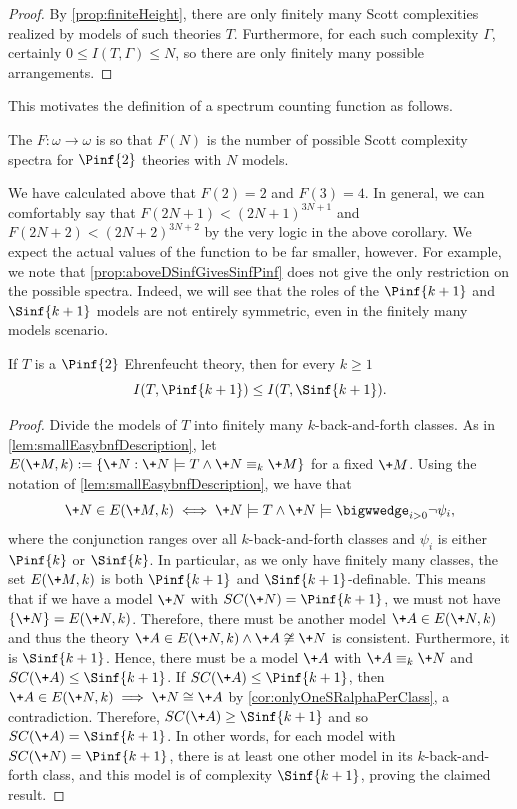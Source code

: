 \documentclass{amsart}
\renewcommand{\-}{\text{-}}
\begin{document}
\begin{proof}
By \cref{prop:finiteHeight}, there are only finitely many Scott complexities realized by models of such theories $T$.
Furthermore, for each such complexity $\Gamma$, certainly $0\leq I(T,\Gamma)\leq N$, so there are only finitely many possible arrangements.
\end{proof}

This motivates the definition of a spectrum counting function as follows.

\begin{definition}
  The  $F:\omega\to\omega$ is so that $F(N)$ is the number of possible Scott complexity spectra for $\Pinf{2}$ theories with $N$ models.
\end{definition}

We have calculated above that $F(2)=2$ and $F(3)=4$.
In general, we can comfortably say that $F(2N+1)<(2N+1)^{3N+1}$ and $F(2N+2)<(2N+2)^{3N+2}$ by the very logic in the above corollary.
We expect the actual values of the function to be far smaller, however.
For example, we note that \cref{prop:aboveDSinfGivesSinfPinf} does not give the only restriction on the possible spectra.
Indeed, we will see that the roles of the $\Pinf{k+1}$ and $\Sinf{k+1}$ models are not entirely symmetric, even in the finitely many models scenario.

\begin{proposition}\label{prop:finiteSpectralInequality}
If $T$ is a $\Pinf{2}$ Ehrenfeucht theory, then for every $k\geq1$
\[I(T,\Pinf{k+1}) \leq I(T,\Sinf{k+1}).\]
\end{proposition}

\begin{proof}
Divide the models of $T$ into finitely many $k$-back-and-forth classes.
As in \cref{lem:smallEasybnfDescription}, let $E(\+M,k):=\{\+N : \+N\models T \land \+N\equiv_k \+M\}$ for a fixed $\+M$.
Using the notation of \cref{lem:smallEasybnfDescription}, we have that 
\[\+N\in E(\+M,k) \iff \+N \models T \land \+N\models\bigwwedge_{i>0} \lnot\psi_i,\]
where the conjunction ranges over all $k$-back-and-forth classes and $\psi_i$ is either $\Pinf{k}$ or $\Sinf{k}$.
In particular, as we only have finitely many classes, the set $E(\+M,k)$ is both $\Pinf{k+1}$ and $\Sinf{k+1}$-definable.
This means that if we have a model $\+N$ with $SC(\+N)=\Pinf{k+1}$, we must not have $\{\+N\}=E(\+N,k)$.
Therefore, there must be another model $\+A\in E(\+N,k)$ and thus the theory $\+A\in E(\+N,k)\land \+A\not\cong \+N$ is consistent. Furthermore, it is $\Sinf{k+1}$.
Hence, there must be a model $\+A$ with $\+A\equiv_k \+N$ and $SC(\+A)\leq\Sinf{k+1}$.
If $SC(\+A)\leq\Pinf{k+1}$, then $\+A\in E(\+N,k)\implies \+N\cong \+A$ by \cref{cor:onlyOneSRalphaPerClass}, a contradiction.
Therefore, $SC(\+A)\geq\Sinf{k+1}$ and so $SC(\+A)=\Sinf{k+1}$.
In other words, for each model with $SC(\+N)=\Pinf{k+1}$, there is at least one other model in its $k$-back-and-forth class, and this model is of complexity $\Sinf{k+1}$, proving the claimed result.
\end{proof}
\end{document}
